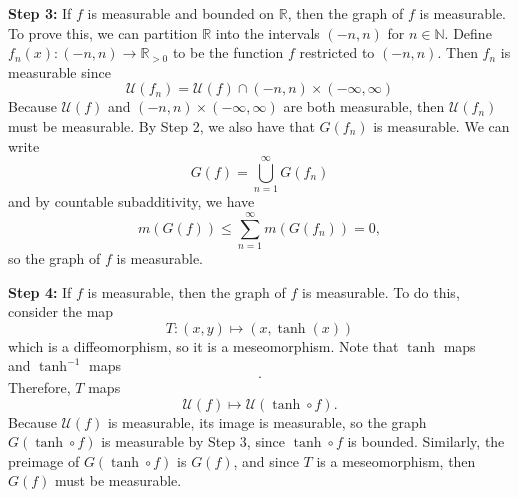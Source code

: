 \documentclass{article}
\begin{document}
\begin{enumerate}
\begin{enumerate}[label=(\alph*)]
        \textbf{Step 3:} If $f$ is measurable and bounded on $\mathbb{R}$, then the graph of $f$ is measurable. To prove this, we can partition $\mathbb{R}$ into the intervals $(-n,n)$ for $n\in \mathbb{N}.$ Define $f_n(x):(-n,n)\to \mathbb{R}_{>0}$ to be the function $f$ restricted to $(-n,n).$ Then $f_n$ is measurable since 
        \begin{equation}
            \mathcal{U}(f_n) = \mathcal{U}(f) \cap (-n,n) \times (-\infty,\infty)
        \end{equation}
        Because $\mathcal{U}(f)$ and $(-n,n) \times (-\infty,\infty)$ are both measurable, then $\mathcal{U}(f_n)$ must be measurable. By Step 2, we also have that $G(f_n)$ is measurable. We can write 
        \begin{equation}
            G(f) = \bigcup_{n=1}^{\infty} G(f_n)
        \end{equation}
        and by countable subadditivity, we have 
        \begin{equation}
            m(G(f)) \le \sum_{n=1}^{\infty} m(G(f_n)) = 0,
        \end{equation}
        so the graph of $f$ is measurable.

        \textbf{Step 4:} If $f$ is measurable, then the graph of $f$ is measurable. To do this, consider the map 
        \begin{equation}
            T: (x,y) \mapsto (x, \tanh(x))
        \end{equation}
        which is a diffeomorphism, so it is a meseomorphism. Note that $\tanh$ maps 
        \begin{equation}
            [0,a) \mapsto [0,\tanh a]
        \end{equation}
        and $\tanh^{-1}$ maps
        \begin{equation}
            [0,a) \mapsto [0, \tanh^{-1} a].
        \end{equation}
        Therefore, $T$ maps 
        \begin{equation}
            \mathcal{U}(f) \mapsto \mathcal{U}(\tanh \circ f).
        \end{equation}
        Because $\mathcal{U}(f)$ is measurable, its image is measurable, so the graph $G(\tanh \circ f)$ is measurable by Step 3, since $\tanh \circ f$ is bounded. Similarly, the preimage of $G(\tanh \circ f)$ is $G(f)$, and since $T$ is a meseomorphism, then $G(f)$ must be measurable.


\end{enumerate}
\end{enumerate}
\end{document}
